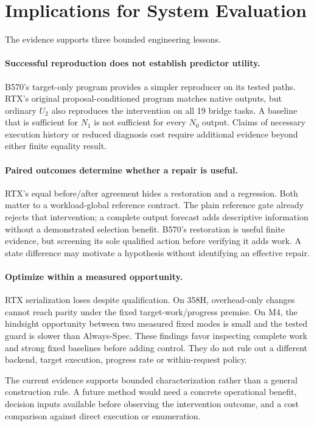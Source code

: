 \section{Implications for System Evaluation}
\label{sec:hardwareconclusion}
The evidence supports three bounded engineering lessons.


\paragraph{Successful reproduction does not establish predictor utility.}
B570's target-only program provides a simpler reproducer on its tested paths. RTX's original proposal-conditioned program matches native outputs, but ordinary $U_2$ also reproduces the intervention on all 19 bridge tasks. A baseline that is sufficient for $N_1$ is not sufficient for every $N_0$ output. Claims of necessary execution history or reduced diagnosis cost require additional evidence beyond either finite equality result.

\paragraph{Paired outcomes determine whether a repair is useful.}
RTX's equal before/after agreement hides a restoration and a regression. Both matter to a workload-global reference contract. The plain reference gate already rejects that intervention; a complete output forecast adds descriptive information without a demonstrated selection benefit. B570's restoration is useful finite evidence, but screening its sole qualified action before verifying it adds work. A state difference may motivate a hypothesis without identifying an effective repair.

\paragraph{Optimize within a measured opportunity.}
RTX serialization loses despite qualification. On 358H, overhead-only changes cannot reach parity under the fixed target-work/progress premise. On M4, the hindsight opportunity between two measured fixed modes is small and the tested guard is slower than Always-Spec. These findings favor inspecting complete work and strong fixed baselines before adding control. They do not rule out a different backend, target execution, progress rate or within-request policy.

The current evidence supports bounded characterization rather than a general construction rule. A future method would need a concrete operational benefit, decision inputs available before observing the intervention outcome, and a cost comparison against direct execution or enumeration.
